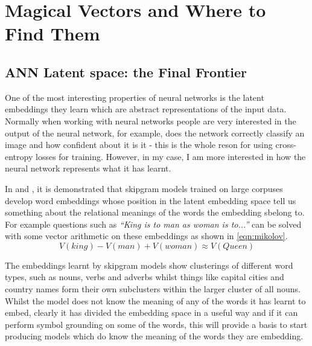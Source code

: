 
\chapter{Magical Vectors and Where to Find Them} %

\label{Chapter5} %


\section{ANN Latent space: the Final Frontier}
One of the most interesting properties of neural networks is the latent embeddings they learn which are abstract representations of the input data. Normally when working with neural networks people are very interested in the output of the neural network, for example, does the network correctly classify an image and how confident about it is it - this is the whole reson for using cross-entropy losses for training. However, in my case, I am more interested in how the neural network represents what it has learnt.

In \cite{mikolov2013distributed} and \cite{mikolov2013efficient}, it is demonstrated that skipgram models trained on large corpuses develop word embeddings whose position in the latent embedding space tell us something about the relational meanings of the words the embedding sbelong to. For example questions such as \textit{``King is to man as woman is to...''} can be solved with some vector arithmetic on these embeddings as shown in \autoref{eqn:mikolov}.
\begin{equation}
V(king) - V(man) + V(woman) \approx V(Queen)
\label{eqn:mikolov}
\end{equation} 

The embeddings learnt by skipgram models show clusterings of different word types, such as nouns, verbs and adverbs whilst things like capital cities and country names form their own subclusters within the larger cluster of all nouns. Whilst the model does not know the meaning of any of the words it has learnt to embed, clearly it has divided the embedding space in a useful way and if it can perform symbol grounding on some of the words, this will provide a basis to start producing models which do know the meaning of the words they are embedding.


